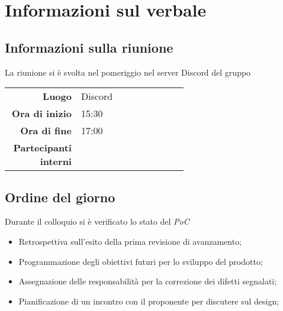 \section{Informazioni sul verbale}

\subsection{Informazioni sulla riunione}
La riunione si è svolta nel pomeriggio nel server Discord del gruppo

\begin{center}
	\begin{tabular}{r|p{0.6\linewidth}}
		\toprule
		\textbf{Luogo} & Discord \\
		\textbf{Ora di inizio} & 15:30 \\
		\textbf{Ora di fine} & 17:00 \\
		\textbf{Partecipanti interni} & \groupTeam
	\end{tabular}
\end{center}

\medskip

\subsection{Ordine del giorno}
Durante il colloquio si è verificato lo stato del \textit{PoC}
\begin{itemize}
	\item Retrospettiva sull'esito della prima revisione di avanzamento;
	\item Programmazione degli obiettivi futuri per lo sviluppo del prodotto;
	\item Assegnazione delle responsabilità per la correzione dei difetti segnalati;
	\item Pianificazione di un incontro con il proponente per discutere sul design;
\end{itemize}